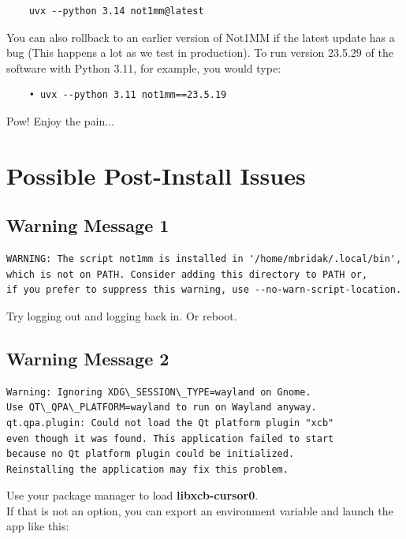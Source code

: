 \documentclass{article}
\begin{document}
\begin{verbatim}
    uvx --python 3.14 not1mm@latest
\end{verbatim}

\noindent You can also rollback to an earlier version of Not1MM if the latest update has a bug (This happens a lot as we test in production). To run version 23.5.29 of the software with Python 3.11, for example, you would type:

\begin{verbatim}
    • uvx --python 3.11 not1mm==23.5.19
\end{verbatim}

Pow! Enjoy the pain... 

\section{Possible Post-Install Issues }

\subsection{Warning Message 1}

\begin{verbatim}
WARNING: The script not1mm is installed in '/home/mbridak/.local/bin',
which is not on PATH. Consider adding this directory to PATH or,
if you prefer to suppress this warning, use --no-warn-script-location.
\end{verbatim}

\noindent Try logging out and logging back in. Or reboot.

\subsection{Warning Message 2}

\begin{verbatim}
Warning: Ignoring XDG\_SESSION\_TYPE=wayland on Gnome.
Use QT\_QPA\_PLATFORM=wayland to run on Wayland anyway.
qt.qpa.plugin: Could not load the Qt platform plugin "xcb"
even though it was found. This application failed to start
because no Qt platform plugin could be initialized.
Reinstalling the application may fix this problem.
\end{verbatim}

\noindent Use your package manager to load \textbf{libxcb-cursor0}.\\
If that is not an option, you can export an environment variable and launch the app like this:
\end{document}
